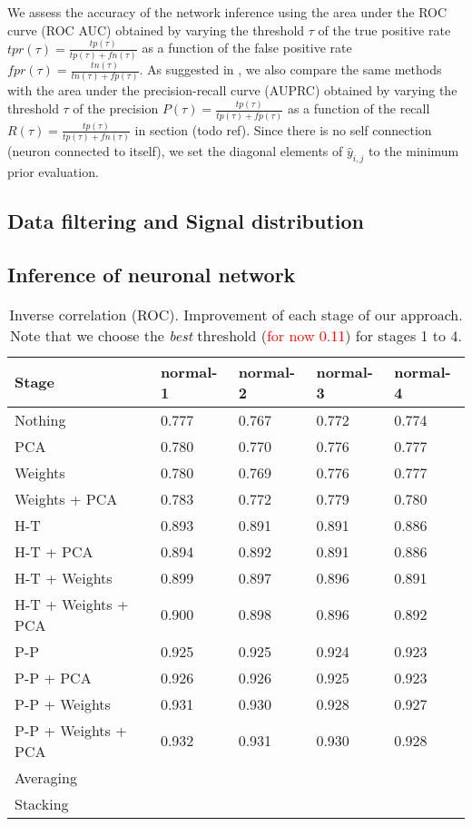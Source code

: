 \documentclass[wcp]{jmlr}
\begin{document}
We assess the accuracy of the network inference using the area under
the ROC curve (ROC AUC) obtained by varying the threshold
$\tau$ of the true positive rate $tpr(\tau) = \frac{tp(\tau)}{tp(\tau) + fn(\tau)}$
as a function of the false positive rate
$fpr(\tau) = \frac{tn(\tau)}{tn(\tau) + fp(\tau)}$.  As suggested in
\cite{schrynemackers2013protocols},
we also compare the same methods with the area under the precision-recall
curve (AUPRC) obtained by varying the threshold
$\tau$ of the precision $P(\tau) = \frac{tp(\tau)}{tp(\tau) + fp(\tau)}$
as a function of the recall $R(\tau) = \frac{tp(\tau)}{tp(\tau) + fn(\tau)}$
in section (todo ref).
Since  there is no self connection (neuron connected to itself), we set
the diagonal elements of $\hat{y}_{i,j}$ to the minimum prior evaluation.

\subsection{Data filtering and Signal distribution}

\subsection{Inference of neuronal network}


\begin{table}[H]
\centering
\caption{Inverse correlation (ROC). Improvement of each stage of our approach. Note that we choose the
         \textit{best} threshold (\textcolor{red}{for now 0.11}) for stages 1 to 4.}
\begin{tabular}{*{5}{l}}
\toprule
Stage               & normal-1 & normal-2 & normal-3 & normal-4 \\
\midrule
Nothing             & 0.777 & 0.767 & 0.772 & 0.774 \\
PCA                 & 0.780 & 0.770 & 0.776 & 0.777 \\
Weights             & 0.780 & 0.769 & 0.776 & 0.777 \\
Weights + PCA       & 0.783 & 0.772 & 0.779 & 0.780 \\
H-T                 & 0.893 & 0.891 & 0.891 & 0.886 \\
H-T + PCA           & 0.894 & 0.892 & 0.891 & 0.886 \\
H-T + Weights       & 0.899 & 0.897 & 0.896 & 0.891 \\
H-T + Weights + PCA & 0.900 & 0.898 & 0.896 & 0.892 \\
P-P                 & 0.925 & 0.925 & 0.924 & 0.923 \\
P-P + PCA           & 0.926 & 0.926 & 0.925 & 0.923 \\
P-P + Weights       & 0.931 & 0.930 & 0.928 & 0.927 \\
P-P + Weights + PCA & 0.932 & 0.931 & 0.930 & 0.928 \\
Averaging           & & & & \\
Stacking            & & & & \\
\bottomrule
\end{tabular}
\end{table}
\end{document}
